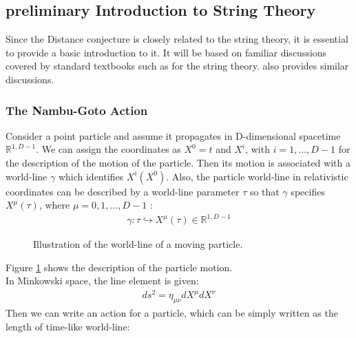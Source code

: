 \subsection{preliminary Introduction to String Theory}
Since the Distance conjecture is closely related to the string theory, it is essential to provide a basic introduction to it. It will be based on familiar discussions covered by standard textbooks such as \parencite{polchinski_string_1998, becker_string_2006, blumenhagen_basic_2013} for the string theory. \parencite{agmon_lectures_2022} also provides similar discussions.

\subsubsection{The Nambu-Goto Action}
Consider a point particle and assume it propagates in D-dimensional spacetime $\mathbb{R}^{1,D-1}$. We can assign the coordinates as $X^{0} = t$ and $X^{i}$, with $i = 1, \dotso , D-1$ for the description of the motion of the particle. Then its motion is associated with a world-line $\gamma$ which identifies $X^{i} (X^{0})$. Also, the particle world-line in relativistic coordinates can be described by a world-line parameter $\tau$ so that $\gamma$ specifies $X^{\mu}(\tau)$, where $\mu = 0,1,\dotso , D-1$ :
\begin{align}
    \gamma : \tau \hookrightarrow X^{\mu} (\tau) \in \mathbb{R} ^{1,D-1}
\end{align}
\begin{figure}[h]
    \centering
    \caption{Illustration of the world-line of a moving particle.}
    \label{fig:worldline}
\end{figure}
Figure \ref{fig:worldline} shows the description of the particle motion. \\
\indent In Minkowski space, the line element is given:
\begin{align}
    ds^{2} = \eta_{\mu \nu} dX^{\mu} dX^{\nu} 
\end{align}
Then we can write an action for a particle, which can be simply written as the length of time-like world-line:
